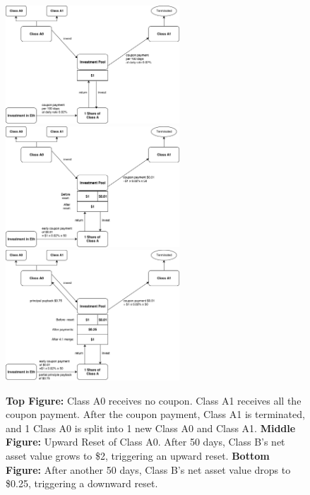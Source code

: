 \documentclass[11pt]{article}%
\numberwithin{equation}{section}
\theoremstyle{plain}
\begin{document}
\begin{appendices}
\begin{figure}[p]
\centering
	\includegraphics[width=0.58\textwidth]{A0_periodic}
	\vspace{1em}
	\includegraphics[width=0.58\textwidth]{A0_upward}
	\vspace{1em}
	\includegraphics[width=0.58\textwidth]{A0_downward}
	\caption{{\bf Top Figure:} Class A0 receives no coupon.  Class A1 receives all the coupon payment. After the coupon payment, Class A1 is terminated, and 1 Class A0 is split into 1 new Class A0 and Class A1. {\bf Middle Figure:} Upward Reset of Class A0. After 50 days, Class B's net asset value grows to \$2, triggering an upward reset. {\bf Bottom Figure:} After another 50 days, Class B's net asset value drops to \$0.25, triggering a downward reset. }\label{fig:A0}
\end{figure}


\end{appendices}
\end{document}
